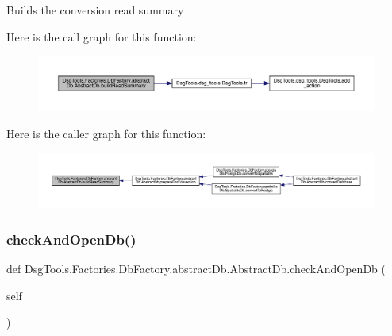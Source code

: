 \begin{DoxyVerb}Builds the conversion read summary
\end{DoxyVerb}
 Here is the call graph for this function\+:
\nopagebreak
\begin{figure}[H]
\begin{center}
\leavevmode
\includegraphics[width=350pt]{class_dsg_tools_1_1_factories_1_1_db_factory_1_1abstract_db_1_1_abstract_db_a6041b5680c46ff5954a5f6d113aa16ba_cgraph}
\end{center}
\end{figure}
Here is the caller graph for this function\+:
\nopagebreak
\begin{figure}[H]
\begin{center}
\leavevmode
\includegraphics[width=350pt]{class_dsg_tools_1_1_factories_1_1_db_factory_1_1abstract_db_1_1_abstract_db_a6041b5680c46ff5954a5f6d113aa16ba_icgraph}
\end{center}
\end{figure}
\mbox{\label{class_dsg_tools_1_1_factories_1_1_db_factory_1_1abstract_db_1_1_abstract_db_ab522beb68a06f7e325bc10a8c0b5506d}} 
\subsubsection{\texorpdfstring{check\+And\+Open\+Db()}{checkAndOpenDb()}}
{\footnotesize\ttfamily def Dsg\+Tools.\+Factories.\+Db\+Factory.\+abstract\+Db.\+Abstract\+Db.\+check\+And\+Open\+Db (\begin{DoxyParamCaption}\item[{}]{self }\end{DoxyParamCaption})}

